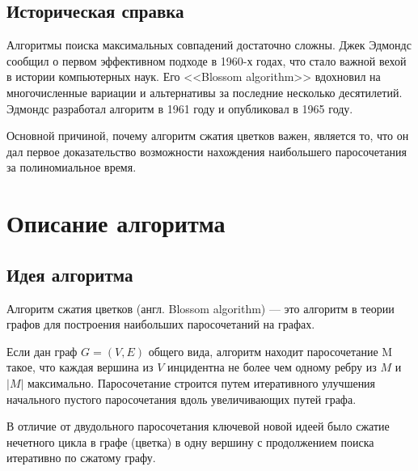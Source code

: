 \documentclass[14pt, a4paper]{extarticle}
\begin{document}
   
    \subsection*{Историческая справка}

    Алгоритмы поиска максимальных совпадений достаточно сложны. Джек Эдмондс сообщил о первом эффективном подходе в 1960-х годах, что стало важной вехой в истории компьютерных наук. Его <<Blossom algorithm>> вдохновил на многочисленные вариации и альтернативы за последние несколько десятилетий.
    Эдмондс разработал алгоритм в 1961 году и опубликовал в 1965 году. 
    
    Основной причиной, почему алгоритм сжатия цветков важен, является то, что он дал первое доказательство возможности нахождения наибольшего паросочетания за полиномиальное время. 

    \pagebreak
    
    \section*{Описание алгоритма}

    \subsection*{Идея алгоритма}
    
    Алгоритм сжатия цветков (англ. Blossom algorithm) — это алгоритм в теории графов для построения наибольших паросочетаний на графах.
    
    Если дан граф $G=(V, E)$ общего вида, алгоритм находит паросочетание M такое, что каждая вершина из $V$ инцидентна не более чем одному ребру из $M$ и $|M|$ максимально. Паросочетание строится путем итеративного улучшения начального пустого паросочетания вдоль увеличивающих путей графа. 
    
    В отличие от двудольного паросочетания ключевой новой идеей было сжатие нечетного цикла в графе (цветка) в одну вершину с продолжением поиска итеративно по сжатому графу.
\end{document}
